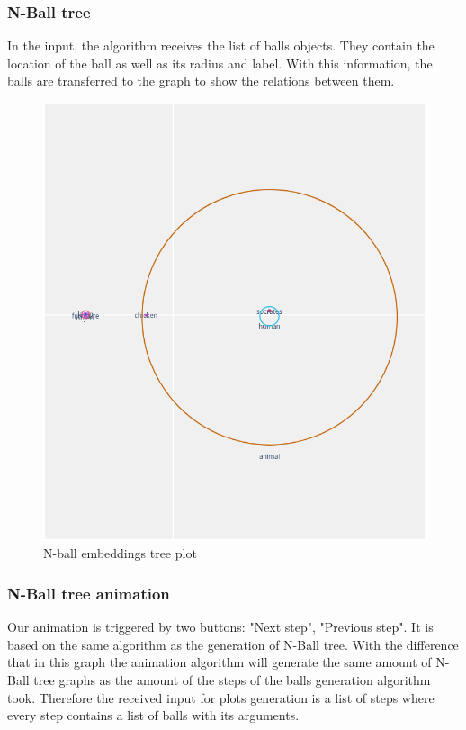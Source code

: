 \subsubsection{N-Ball tree}

In the input, the algorithm receives the list of balls objects. They contain the location of the ball as well as its radius and label. With this information, the balls are transferred to the graph to show the relations between them.

\begin{figure}[H]
	\includegraphics[width=\textwidth]{res/balls_graph.png}
	\caption{N-ball embeddings tree plot}
	\label{fig:balls_graph}
\end{figure}


\subsubsection{N-Ball tree animation}

Our animation is triggered by two buttons: "Next step", "Previous step". It is based on the same algorithm as the generation of N-Ball tree. With the difference that in this graph the animation algorithm will generate the same amount of N-Ball tree graphs as the amount of the steps of the balls generation algorithm took.  Therefore the received input for plots generation is a list of steps where every step contains a list of balls with its arguments.

